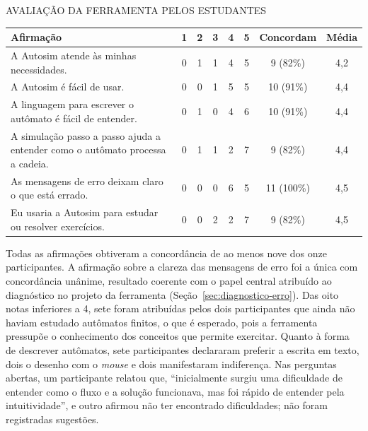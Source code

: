 \documentclass[
    12pt
    ,oneside
    ,a4paper
    ,chapter=TITLE
    ,section=TITLE
    ,sumario=abnt-6027-2012]{abntex2}
\begin{document}
\begin{quadro}[h]
    \centering
    \caption{AVALIAÇÃO DA FERRAMENTA PELOS ESTUDANTES}
    \label{quad:percepcao}
    \small
    \begin{tabularx}{\textwidth}{|Z|c|c|c|c|c|c|c|}
        \hline
        \textbf{Afirmação} & \textbf{1} & \textbf{2} & \textbf{3} & \textbf{4} & \textbf{5} & \textbf{Concordam} & \textbf{Média} \\
        \hline
        A Autosim atende às minhas necessidades. & 0 & 1 & 1 & 4 & 5 & 9 (82\%) & 4,2 \\
        \hline
        A Autosim é fácil de usar. & 0 & 0 & 1 & 5 & 5 & 10 (91\%) & 4,4 \\
        \hline
        A linguagem para escrever o autômato é fácil de entender. & 0 & 1 & 0 & 4 & 6 & 10 (91\%) & 4,4 \\
        \hline
        A simulação passo a passo ajuda a entender como o autômato processa a cadeia. & 0 & 1 & 1 & 2 & 7 & 9 (82\%) & 4,4 \\
        \hline
        As mensagens de erro deixam claro o que está errado. & 0 & 0 & 0 & 6 & 5 & 11 (100\%) & 4,5 \\
        \hline
        Eu usaria a Autosim para estudar ou resolver exercícios. & 0 & 0 & 2 & 2 & 7 & 9 (82\%) & 4,5 \\
        \hline
    \end{tabularx}
\end{quadro}

Todas as afirmações obtiveram a concordância de ao menos nove dos onze participantes. A
afirmação sobre a clareza das mensagens de erro foi a única com concordância unânime,
resultado coerente com o papel central atribuído ao diagnóstico no projeto da ferramenta
(Seção~\ref{sec:diagnostico-erro}). Das oito notas inferiores a 4, sete foram atribuídas pelos
dois participantes que ainda não haviam estudado autômatos finitos, o que é esperado, pois a
ferramenta pressupõe o conhecimento dos conceitos que permite exercitar. Quanto à forma de
descrever autômatos, sete participantes declararam preferir a escrita em texto, dois o desenho
com o \textit{mouse} e dois manifestaram indiferença. Nas perguntas abertas, um participante
relatou que, ``inicialmente surgiu uma dificuldade de entender como o fluxo e a solução
funcionava, mas foi rápido de entender pela intuitividade'', e outro afirmou não ter
encontrado dificuldades; não foram registradas sugestões.
\end{document}
